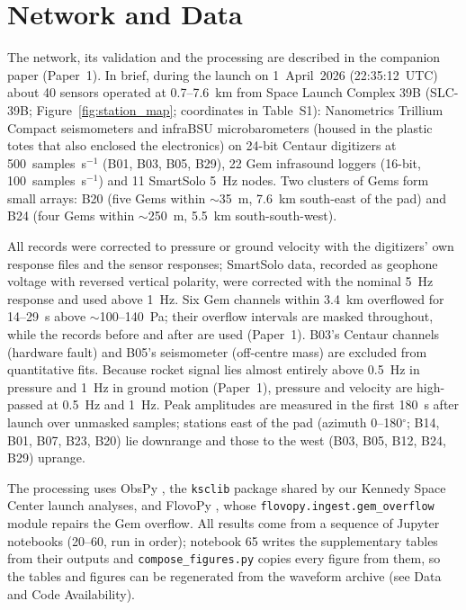 \documentclass[]{seismica}
\newcommand{\supptab}[1]{Table~S#1}
\newcommand{\paperone}{Paper~1}
\begin{document}
\section{Network and Data}
\label{sec:data}

The network, its validation and the processing are described in the
companion paper (\paperone). In brief, during the launch on 1~April~2026 (22:35:12~UTC)
about 40 sensors operated at 0.7--7.6~km from Space Launch Complex 39B
(SLC-39B; Figure~\ref{fig:station_map}; coordinates in \supptab{1}):
Nanometrics Trillium Compact seismometers and infraBSU microbarometers
(housed in the plastic totes that also enclosed the electronics) on 24-bit
Centaur digitizers at 500~samples~s$^{-1}$ (B01, B03, B05, B29),
22 Gem infrasound loggers (16-bit, 100~samples~s$^{-1}$) and 11 SmartSolo
5~Hz nodes. Two clusters of Gems form small arrays: B20 (five Gems within
$\sim$35~m, 7.6~km south-east of the pad) and B24 (four Gems within
$\sim$250~m, 5.5~km south-south-west).

All records were corrected to pressure or ground velocity with the
digitizers' own response files and the sensor responses; SmartSolo data,
recorded as geophone voltage with reversed vertical polarity, were
corrected with the nominal 5~Hz response and used above 1~Hz. Six Gem
channels within 3.4~km overflowed for 14--29~s above
$\sim$100--140~Pa; their overflow intervals are masked throughout, while
the records before and after are used (\paperone). B03's Centaur channels
(hardware fault) and B05's seismometer (off-centre mass) are excluded from
quantitative fits. Because rocket signal lies almost entirely above
0.5~Hz in pressure and 1~Hz in ground motion (\paperone), pressure and
velocity are high-passed at 0.5~Hz and 1~Hz. Peak amplitudes are measured
in the first 180~s after launch over unmasked samples; stations east of
the pad (azimuth 0--180$^{\circ}$; B14, B01, B07, B23, B20) lie downrange
and those to the west (B03, B05, B12, B24, B29) uprange.

The processing uses ObsPy \citep{Beyreuther2010,krischer_obspy_2015},
the \texttt{ksclib} package shared by our Kennedy Space Center launch
analyses, and FlovoPy \citep{flovopy_2026}, whose
\texttt{flovopy.ingest.gem\_overflow} module repairs the Gem overflow.
All results come from a sequence of Jupyter notebooks (20--60, run in
order); notebook 65 writes the supplementary tables from their outputs
and \texttt{compose\_figures.py} copies every figure from them, so the
tables and figures can be regenerated from the waveform archive (see
Data and Code Availability).
\end{document}
